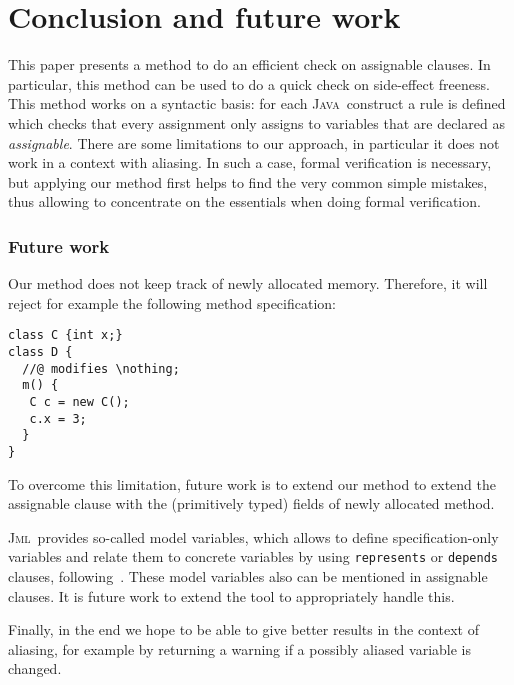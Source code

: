 \documentclass[a4paper]{llncs}
\newcommand{\jml}{\textsc{Jml}}
\newcommand{\java}{\textsc{Java}}
\newcommand{\nothing}{\texttt{\(\backslash\)nothing}}
\begin{document}
\section{Conclusion and future work}
\label{sec-con-and-fut-wor}
This paper presents a method to do an efficient check on assignable
clauses. In particular, this method can be used to do a quick check on 
side-effect freeness.
This method works on a syntactic basis: 
for each \java\ construct a rule is defined which checks that every
assignment only assigns to variables that are declared as 
\emph{assignable}. There are some limitations to our approach, in
particular it does not work in a context with aliasing. In such a
case, formal verification is necessary, but applying our method first
helps to find the very common simple mistakes, thus allowing to
concentrate on the essentials when doing formal verification.


\subsubsection{Future work}
Our method does not keep track of newly allocated memory. Therefore,
it will reject for example the following method specification:
\begin{verbatim}
class C {int x;}
class D {
  //@ modifies \nothing;
  m() {
   C c = new C();
   c.x = 3;
  }
}
\end{verbatim}
To overcome this limitation, future work is to extend our method to extend the
assignable clause with the (primitively typed) fields of newly
allocated method.

\jml\ provides so-called model variables, which allows to define
specification-only variables and relate them to concrete variables by
using \texttt{represents} or \texttt{depends} clauses,
following~\cite{Leino97}. These model variables also can be mentioned
in assignable clauses. It is future work to extend the tool to
appropriately handle this.


Finally, in the end we hope to be able to give better results in the
context of aliasing, for example by returning a warning if a possibly
aliased variable is changed.



\end{document}

